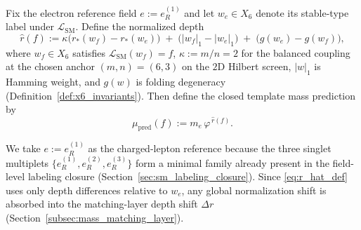 \begin{definition}\label{def:mass_template}
Fix the electron reference field $e:=e_R^{(1)}$ and let $w_e\in X_6$ denote its stable-type label under $\mathcal{L}_{\mathrm{SM}}$.
Define the normalized depth
\begin{equation}\label{eq:r_hat_def}
\widehat r(f):=\kappa\bigl(r_\ast(w_f)-r_\ast(w_e)\bigr)
\;+\;\bigl(|w_f|_1-|w_e|_1\bigr)
\;+\;\bigl(g(w_e)-g(w_f)\bigr),
\end{equation}
where $w_f\in X_6$ satisfies $\mathcal{L}_{\mathrm{SM}}(w_f)=f$, $\kappa:=m/n=2$ for the balanced coupling at the chosen anchor $(m,n)=(6,3)$ on the $2$D Hilbert screen, $|w|_1$ is Hamming weight, and $g(w)$ is folding degeneracy (Definition~\ref{def:x6_invariants}).
Then define the closed template mass prediction by
\begin{equation}\label{eq:mass_template}
\mu_{\mathrm{pred}}(f):=m_e\,\varphi^{\,\widehat r(f)}.
\end{equation}
\end{definition}

\begin{center}
\end{center}

\begin{remark}\label{rem:electron_reference_choice}
We take $e:=e_R^{(1)}$ as the charged-lepton reference because the three singlet multiplets $\{e_R^{(1)},e_R^{(2)},e_R^{(3)}\}$ form a minimal family already present in the field-level labeling closure (Section~\ref{sec:sm_labeling_closure}).
Since \eqref{eq:r_hat_def} uses only depth differences relative to $w_e$, any global normalization shift is absorbed into the matching-layer depth shift $\Delta r$ (Section~\ref{subsec:mass_matching_layer}).
\end{remark}

